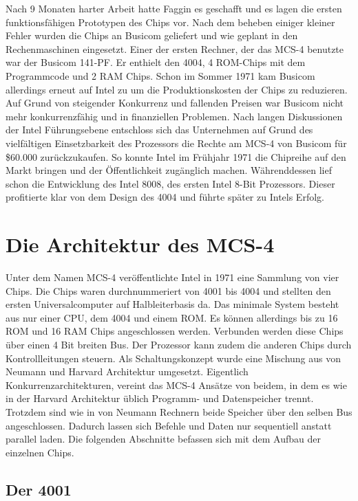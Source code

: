 Nach 9 Monaten harter Arbeit hatte Faggin es geschafft und es lagen die ersten funktionsfähigen Prototypen des Chips vor.
Nach dem beheben einiger kleiner Fehler wurden die Chips an Busicom geliefert und wie geplant in den Rechenmaschinen eingesetzt. Einer der ersten Rechner, der das MCS-4 benutzte war der Busicom 141-PF. Er enthielt den 4004, 4 ROM-Chips mit dem Programmcode und 2 RAM Chips. Schon im Sommer 1971 kam
 Busicom allerdings erneut auf Intel zu um die Produktionskosten der Chips zu reduzieren. Auf Grund von steigender Konkurrenz und fallenden Preisen war Busicom nicht mehr konkurrenzfähig und in finanziellen Problemen. Nach langen Diskussionen der Intel Führungsebene entschloss sich das Unternehmen auf Grund des vielfältigen Einsetzbarkeit des Prozessors die Rechte am MCS-4 von Busicom für {\$}60.000 zurückzukaufen. So konnte Intel im Frühjahr 1971 die Chipreihe auf den Markt bringen und der Öffentlichkeit zugänglich machen. Währenddessen lief schon die Entwicklung des Intel 8008, des ersten Intel 8-Bit Prozessors. Dieser profitierte klar von dem Design des 4004 und führte später zu Intels Erfolg.
 
\section{Die Architektur des MCS-4}
Unter dem Namen MCS-4 veröffentlichte Intel in 1971 eine Sammlung von vier Chips. Die Chips waren durchnummeriert von 4001 bis 4004 und stellten den ersten Universalcomputer auf Halbleiterbasis da. Das minimale System besteht aus nur einer CPU, dem 4004 und einem ROM. Es können allerdings bis zu 16 ROM und 16 RAM Chips angeschlossen werden. Verbunden werden diese Chips über einen 4 Bit breiten Bus. Der Prozessor kann zudem die anderen Chips durch Kontrollleitungen steuern. Als Schaltungskonzept wurde eine Mischung aus von Neumann und Harvard Architektur umgesetzt. Eigentlich Konkurrenzarchitekturen, vereint das MCS-4 Ansätze von beidem, in dem es wie in der Harvard Architektur üblich Programm- und Datenspeicher trennt. Trotzdem sind wie in von Neumann Rechnern beide Speicher über den selben Bus angeschlossen. Dadurch lassen sich Befehle und Daten nur sequentiell anstatt parallel laden. Die folgenden Abschnitte befassen sich mit dem Aufbau der einzelnen Chips.

\subsection{Der 4001}

